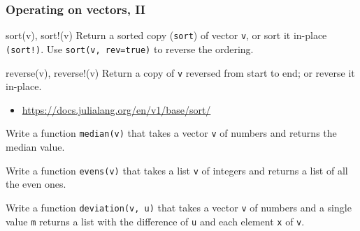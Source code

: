 \documentclass[english,serif,mathserif,xcolor=pdftex,dvipsnames,table]{beamer}
\begin{document}
\begin{frame}
  \frametitle{Operating on vectors, II}


\begin{describe}{\ttfamily sort(v), sort!(v)}
  Return a sorted copy (\texttt{sort}) of vector \texttt{v}, or sort
  it in-place \texttt{(sort!)}.  Use \texttt{sort(v, rev=true)} to
  reverse the ordering.
\end{describe}

  \begin{describe}{\ttfamily reverse(v), reverse!(v)}
    Return a copy of \texttt{v} reversed from start to end;
    or reverse it in-place.
  \end{describe}


  \+
  \begin{references}
    \begin{itemize}
    \item \url{https://docs.julialang.org/en/v1/base/sort/}
  \end{itemize}
  \end{references}
\end{frame}


\begin{frame}
  \begin{exercise*}[3.E]
    Write a function \texttt{median(v)} that takes a vector \texttt{v}
    of numbers and returns the median value.
  \end{exercise*}

  \+
  \begin{exercise*}[3.F]
    Write a function \texttt{evens(v)} that takes a list \texttt{v} of
    integers and returns a list of all the even ones.
  \end{exercise*}

  \+
  \begin{exercise*}[3.G]
    Write a function \texttt{deviation(v, u)} that takes a vector \texttt{v} of
    numbers and a single value \texttt{m} returns a list with the difference of
    \texttt{u} and each element \texttt{x} of \texttt{v}.
  \end{exercise*}
\end{frame}
\end{document}
